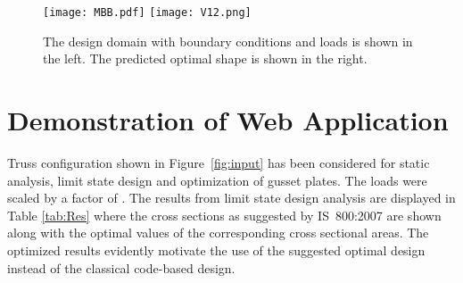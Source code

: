 \documentclass[preprint]{elsarticle}
\begin{document}
\begin{figure*}[!htbp]
\centering
\texttt{[image: MBB.pdf]} \hfil
\texttt{[image: V12.png]}
\caption{The design domain with boundary conditions and loads is shown in the left. The predicted optimal shape is shown in the right.}
\label{fig:MBB}
\end{figure*}


\section{Demonstration of Web Application} 
\label{Demo}
Truss configuration shown in Figure~\ref{fig:input} has been considered for static
analysis, limit state design and optimization of gusset plates. The loads were scaled by a factor of . The results from
limit state design analysis are displayed in Table \ref{tab:Res} where the cross
sections as suggested by IS~800:2007 are shown along with the optimal values of
the corresponding cross sectional areas. The optimized results evidently motivate
the use of the suggested optimal design instead of the classical code-based design.


\begin{table*}[!htbp]
\caption{Limit state analysis results comparing IS-800:2007 code results with optimal values}
\label{tab:Res}
\end{table*}
\end{document}
